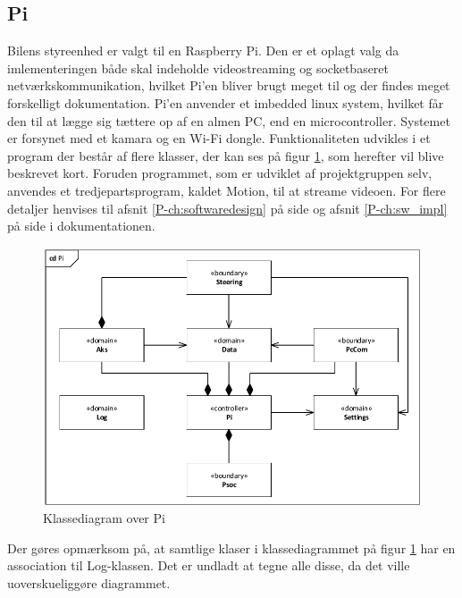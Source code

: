 \subsection{Pi}

Bilens styreenhed er valgt til en Raspberry Pi. Den er et oplagt valg da imlementeringen både skal indeholde videostreaming og socketbaseret netværkskommunikation, hvilket Pi'en bliver brugt meget til og der findes meget forskelligt dokumentation. Pi'en anvender et imbedded linux system, hvilket får den til at lægge sig tættere op af en almen PC, end en microcontroller. Systemet er forsynet med et kamara\cite{lib:cam} og en Wi-Fi dongle\cite{lib:wifi}. Funktionaliteten udvikles i et program der består af flere klasser, der kan ses på figur \ref{fig:cd_pi}, som herefter vil blive beskrevet kort. Foruden programmet, som er udviklet af projektgruppen selv, anvendes et tredjepartsprogram, kaldet Motion\cite{lib:motion-on-raspberry}, til at streame videoen. For flere detaljer henvises til afsnit \ref{P-ch:softwaredesign}  på side \pageref{P-ch:softwaredesign} og afsnit \ref{P-ch:sw_impl}  på side \pageref{P-ch:sw_impl} i dokumentationen.

\begin{figure}[h]
\centering
\includegraphics[width=0.7\textwidth* 9/10]{../fig/diagrammer/bil/cd_pi.pdf}
\caption{Klassediagram over Pi}
\label{fig:cd_pi}
\end{figure}

Der gøres opmærksom på, at samtlige klaser i klassediagrammet på figur \ref{fig:cd_pi} har en association til Log-klassen. Det er undladt at tegne alle disse, da det ville uoverskueliggøre diagrammet.










